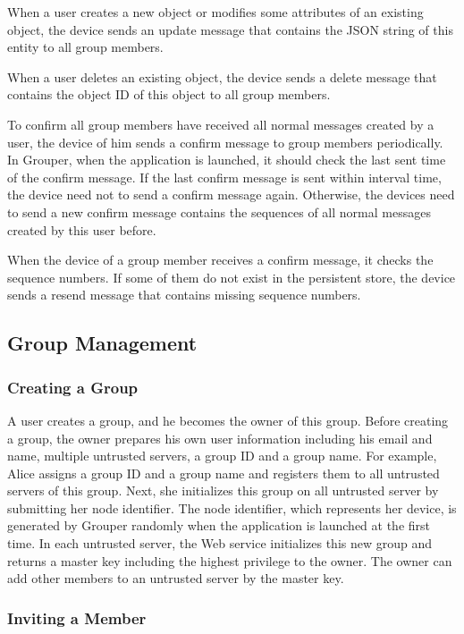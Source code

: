 \documentclass[twocolumn,10pt]{article}
\begin{document}
When a user creates a new object or modifies some attributes of an existing object, the device sends an update message that contains the JSON string of this entity to all group members.

When a user deletes an existing object, the device sends a delete message that contains the object ID of this object to all group members.

To confirm all group members have received all normal messages created by a user, the device of him sends a confirm message to group members periodically. 
In Grouper, when the application is launched, it should check the last sent time of the confirm message. 
If the last confirm message is sent within interval time, the device need not to send a confirm message again. 
Otherwise, the devices need to send a new confirm message contains the sequences of all normal messages created by this user before.

When the device of a group member receives a confirm message, it checks the sequence numbers. 
If some of them do not exist in the persistent store, the device sends a resend message that contains missing sequence numbers.

\subsection{Group Management}

\subsubsection{Creating a Group}

A user creates a group, and he becomes the owner of this group.  
Before creating a group, the owner prepares his own user information including his email and name, multiple untrusted servers, a group ID and a group name. 
For example, Alice assigns a group ID and a group name and registers them to all untrusted servers of this group. 
Next, she initializes this group on all untrusted server by submitting her node identifier. 
The node identifier, which represents her device, is generated by Grouper randomly when the application is launched at the first time. 
In each untrusted server, the Web service initializes this new group and returns a master key including the highest privilege to the owner. 
The owner can add other members to an untrusted server by the master key.

\subsubsection{Inviting a Member}
\end{document}
